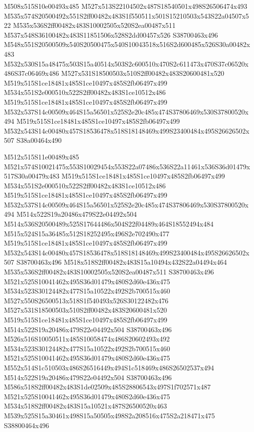 \documentclass{article}
\begin{document}
\begin{multicols}{2}
M508x515S10e00493x485 M527x513S22104502x487S18540501x498S26506474x493 M535x574S20500492x551S2ff00482x483S1f550511x501S15210503x543S22a04507x522 M535x536S2ff00482x483S10002505x520S2ea00487x511 M537x548S36100482x483S11851506x528S2dd00457x526 S38700463x496 M548x551S20500509x540S20500475x540S10043518x516S2d600485x526S30a00482x483 M532x530S15a48475x503S15a40514x503S2c600510x470S2c611473x470S37c06520x486S37c06469x486 M527x531S18500503x510S2ff00482x483S20600481x520 M519x515S1ce18481x485S1ce10497x485S2fb06497x499 M534x551S2e000510x522S2ff00482x483S1ce10512x486 M519x515S1ce18481x485S1ce10497x485S2fb06497x499 M532x537S14c00509x464S15a56501x525S2e20c485x474S37806469x530S37800520x494 M519x515S1ce18481x485S1ce10497x485S2fb06497x499 M532x543S14c00480x457S18536478x518S18148469x499S23400484x495S26626502x507 S38a00464x490

M512x515S11e00489x485 M521x574S10021475x553S10029454x553S22a07486x536S22a11461x536S36d01479x517S30a00479x483 M519x515S1ce18481x485S1ce10497x485S2fb06497x499 M534x551S2e000510x522S2ff00482x483S1ce10512x486 M519x515S1ce18481x485S1ce10497x485S2fb06497x499 M532x537S14c00509x464S15a56501x525S2e20c485x474S37806469x530S37800520x494 M514x522S19a20486x479S22e04492x504 M514x536S20500489x525S17644486x504S22f04489x464S18552494x484 M515x524S15a36485x512S18252495x496S2e702490x477 M519x515S1ce18481x485S1ce10497x485S2fb06497x499 M532x543S14c00480x457S18536478x518S18148469x499S23400484x495S26626502x507 S38700463x496 M518x518S2ff00482x483S15a10494x432S22a04494x464 M535x536S2ff00482x483S10002505x520S2ea00487x511 S38700463x496 M521x525S10041462x495S36d01479x480S2d60e436x475 M534x523S30124482x477S15a10522x492S2b700515x460 M527x550S26500513x518S1f540493x526S30122482x476 M527x531S18500503x510S2ff00482x483S20600481x520 M519x515S1ce18481x485S1ce10497x485S2fb06497x499 M514x522S19a20486x479S22e04492x504 S38700463x496 M526x516S10050511x485S10058474x486S20602493x492 M534x523S30124482x477S15a10522x492S2b700515x460 M521x525S10041462x495S36d01479x480S2d60e436x475 M552x514S1c510503x486S26516449x494S1c518469x486S26502537x494 M514x522S19a20486x479S22e04492x504 S38700463x496 M586x518S2ff00482x483S1de02509x485S28806543x497S1f702571x487 M521x525S10041462x495S36d01479x480S2d60e436x475 M534x518S2ff00482x483S15a10521x487S26500520x463 M539x525S15a30461x498S15a50505x498S2a208516x475S2a218471x475 S38800464x496


\end{multicols}
\end{document}
